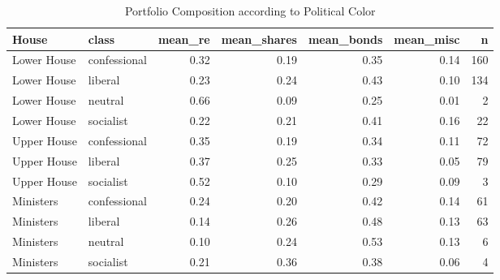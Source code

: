 \begin{table}[ht]
\centering
\begingroup\small
\begin{tabular}{llrrrrr}
  \hline
House & class & mean\_re & mean\_shares & mean\_bonds & mean\_misc & n \\ 
  \hline
Lower House & confessional & 0.32 & 0.19 & 0.35 & 0.14 & 160 \\ 
  Lower House & liberal & 0.23 & 0.24 & 0.43 & 0.10 & 134 \\ 
  Lower House & neutral & 0.66 & 0.09 & 0.25 & 0.01 &   2 \\ 
  Lower House & socialist & 0.22 & 0.21 & 0.41 & 0.16 &  22 \\ 
  Upper House & confessional & 0.35 & 0.19 & 0.34 & 0.11 &  72 \\ 
  Upper House & liberal & 0.37 & 0.25 & 0.33 & 0.05 &  79 \\ 
  Upper House & socialist & 0.52 & 0.10 & 0.29 & 0.09 &   3 \\ 
  Ministers & confessional & 0.24 & 0.20 & 0.42 & 0.14 &  61 \\ 
  Ministers & liberal & 0.14 & 0.26 & 0.48 & 0.13 &  63 \\ 
  Ministers & neutral & 0.10 & 0.24 & 0.53 & 0.13 &   6 \\ 
  Ministers & socialist & 0.21 & 0.36 & 0.38 & 0.06 &   4 \\ 
   \hline
\end{tabular}
\endgroup
\caption{Portfolio Composition according to Political Color} 
\label{fig:portcomp2}
\end{table}
